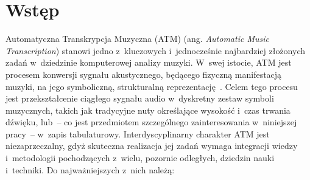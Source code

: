 \chapter{Wstęp}
\label{chap:wstep}

Automatyczna Transkrypcja Muzyczna (ATM) (ang. \textit{Automatic Music Transcription}) stanowi jedno z~kluczowych i~jednocześnie najbardziej złożonych zadań w~dziedzinie komputerowej analizy muzyki. W~swej istocie, ATM jest procesem konwersji sygnału akustycznego, będącego fizyczną manifestacją muzyki, na jego symboliczną, strukturalną reprezentację~\autocite{KlapuriDavy2006SignalProcessing,Benetos2019AutomaticMusicTranscription}. Celem tego procesu jest przekształcenie ciągłego sygnału audio w~dyskretny zestaw symboli muzycznych, takich jak tradycyjne nuty określające wysokość i~czas trwania dźwięku, lub~– co jest przedmiotem szczególnego zainteresowania w~niniejszej pracy~– w~zapis tabulaturowy. Interdyscyplinarny charakter ATM jest niezaprzeczalny, gdyż skuteczna realizacja jej zadań wymaga integracji wiedzy i~metodologii pochodzących z~wielu, pozornie odległych, dziedzin nauki i~techniki. Do najważniejszych z~nich należą:
